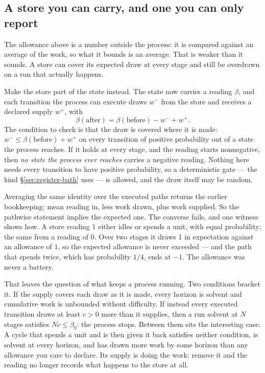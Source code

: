 \documentclass[11pt]{article}
\begin{document}
\subsection{A store you can carry, and one you can only report}
\label{sec:pathwise-store}

The allowance above is a number outside the process: it is compared against
an average of the work, so what it bounds is an average. That is weaker than
it sounds. A store can cover its expected draw at every stage and still be
overdrawn on a run that actually happens.

Make the store part of the state instead. The state now carries a reading
$\beta$, and each transition the process can execute draws $w^-$ from the
store and receives a declared supply $w^+$, with
\[
 \beta(\text{after})=\beta(\text{before})-w^-+w^+ .
\]
The condition to check is that the draw is covered where it is made:
$w^-\leq\beta(\text{before})+w^+$ on every transition of positive probability
out of a state the process reaches. If it holds at every stage, and the
reading starts nonnegative, then \emph{no state the process ever reaches}
carries a negative reading. Nothing here needs every transition to have
positive probability, so a deterministic gate --- the kind
\S\ref{sec:register-bath} uses --- is allowed, and the draw itself may be
random.

Averaging the same identity over the executed paths returns the earlier
bookkeeping: mean reading in, less work drawn, plus work supplied. So the
pathwise statement implies the expected one. The converse fails, and one
witness shows how. A store reading $1$ either idles or spends a unit, with
equal probability; the same from a reading of $0$. Over two stages it draws
$1$ in expectation against an allowance of $1$, so the expected allowance is
never exceeded --- and the path that spends twice, which has probability
$1/4$, ends at $-1$. The allowance was never a battery.

That leaves the question of what keeps a process running. Two conditions
bracket it. If the supply covers each draw as it is made, every horizon is
solvent and cumulative work is unbounded without difficulty. If instead every
executed transition draws at least $c>0$ more than it supplies, then a run
solvent at $N$ stages satisfies $Nc\leq\beta_0$: the process stops. Between
them sits the interesting case. A cycle that spends a unit and is then given
it back satisfies neither condition, is solvent at every horizon, and has
drawn more work by some horizon than any allowance you care to declare. Its
supply is doing the work: remove it and the reading no longer records what
happens to the store at all.
\end{document}
